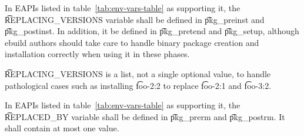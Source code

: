  In EAPIs listed in table~\ref{tab:env-vars-table} as supporting
it, the \t{REPLACING\_VERSIONS} variable shall be defined in \t{pkg\_preinst} and \t{pkg\_postinst}.
In addition, it  be defined in \t{pkg\_pretend} and \t{pkg\_setup}, although ebuild authors
should take care to handle binary package creation and installation correctly when using it in these
phases.

\t{REPLACING\_VERSIONS} is a list, not a single optional value, to handle pathological cases such as
installing \t{foo-2:2} to replace \t{foo-2:1} and \t{foo-3:2}.

In EAPIs listed in table~\ref{tab:env-vars-table} as supporting it, the \t{REPLACED\_BY} variable
shall be defined in \t{pkg\_prerm} and \t{pkg\_postrm}. It shall contain at most one value.


